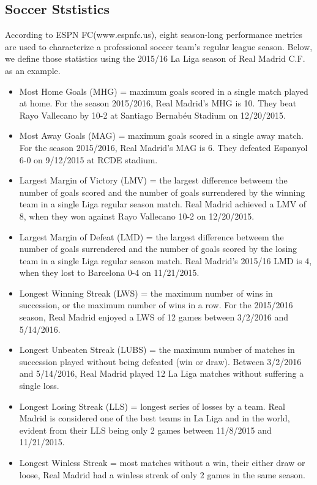 \documentclass[inte,nonblindrev]{informs3} %
\begin{document}
\subsection*{Soccer Ststistics}
According to ESPN FC(www.espnfc.us), eight season-long performance metrics are used to characterize a professional soccer team's regular league season. Below, we define those statistics using the 2015/16 La Liga season of Real Madrid C.F. as an example.
\begin{itemize}
\item Most Home Goals (MHG) = maximum goals scored in a single match played at home. For the season 2015/2016, Real Madrid’s MHG is 10. They beat Rayo Vallecano by 10-2 at Santiago Bernabéu Stadium on 12/20/2015.
\item Most Away Goals (MAG) = maximum goals scored in a single away match. For the season 2015/2016, Real Madrid’s MAG is 6. They defeated Espanyol 6-0 on 9/12/2015 at RCDE stadium.
\item Largest Margin of Victory (LMV) = the largest difference betweem the number of goals scored and the number of goals surrendered by the winning team in a single Liga regular season match. Real Madrid achieved a LMV of 8, when they won against Rayo Vallecano 10-2 on 12/20/2015.
\item Largest Margin of Defeat (LMD) = the largest difference betweem the number of goals surrendered and the number of goals scored by the losing team in a single Liga regular season match. Real Madrid's 2015/16 LMD is 4, when they lost to Barcelona 0-4 on 11/21/2015.
\item Longest Winning Streak (LWS) = the maximum number of wins in succession, or the maximum number of wins in a row. For the 2015/2016 season, Real Madrid enjoyed a LWS of 12 games between 3/2/2016 and 5/14/2016.
\item Longest Unbeaten Streak (LUBS) = the maximum number of matches in succession played without being defeated (win or draw). Between 3/2/2016 and 5/14/2016, Real Madrid played 12 La Liga matches without suffering a single loss.
\item Longest Losing Streak (LLS) = longest series of losses by a team. Real Madrid is considered one of the best teams in La Liga and in the world, evident from their LLS being only 2 games between 11/8/2015 and 11/21/2015.
\item Longest Winless Streak = most matches without a win, their either draw or loose, Real Madrid had a winless streak of only 2 games in the same season.
\end{itemize} 
\end{document}
